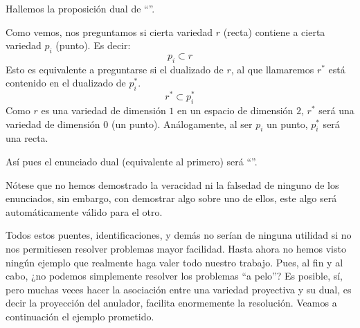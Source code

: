 \begin{exa}
	Hallemos la proposición dual de ``''.
	
	Como vemos, nos preguntamos si cierta variedad $r$ (recta) contiene a cierta variedad $p_i$ (punto). Es decir:
	\[p_i\subset r\]
	Esto es equivalente a preguntarse si el dualizado de $r$, al que llamaremos $r^*$ está contenido en el dualizado de $p_i^*$.
	\[r^*\subset p_i^*\]
	Como $r$ es una variedad de dimensión $1$ en un espacio de dimensión $2$, $r^*$ será una variedad de dimensión $0$ (un punto). Análogamente, al ser $p_i$ un punto, $p_i^*$ será una recta.
	
	Así pues el enunciado dual (equivalente al primero) será ``''.
	
	Nótese que no hemos demostrado la veracidad ni la falsedad de ninguno de los enunciados, sin embargo, con demostrar algo sobre uno de ellos, este algo será automáticamente válido para el otro.
\end{exa}
Todos estos puentes, identificaciones, y demás no serían de ninguna utilidad si no nos permitiesen resolver problemas mayor facilidad. Hasta ahora no hemos visto ningún ejemplo que realmente haga valer todo nuestro trabajo. Pues, al fin y al cabo, ¿no podemos simplemente resolver los problemas ``a pelo''? Es posible, sí, pero muchas veces hacer la asociación entre una variedad proyectiva y su dual, es decir la proyección del anulador, facilita enormemente la resolución. Veamos a continuación el ejemplo prometido.
